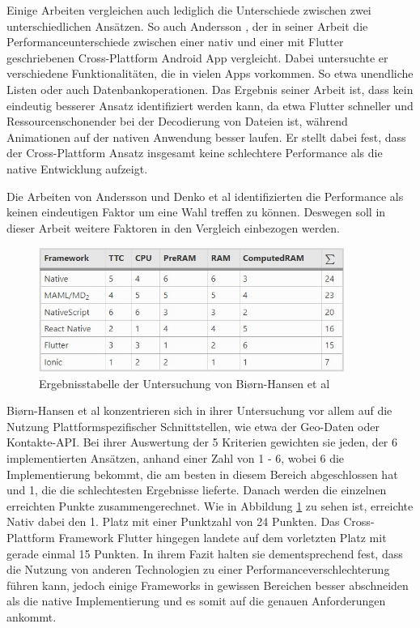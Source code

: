 Einige Arbeiten vergleichen auch lediglich die Unterschiede zwischen zwei unterschiedlichen Ansätzen. So auch Andersson \cite{Andersson_2022}, der in seiner Arbeit die Performanceunterschiede zwischen einer nativ und einer mit Flutter geschriebenen Cross-Plattform Android App vergleicht. Dabei untersuchte er verschiedene Funktionalitäten, die in vielen Apps vorkommen. So etwa unendliche Listen oder auch Datenbankoperationen. Das Ergebnis seiner Arbeit ist, dass kein eindeutig besserer Ansatz identifiziert werden kann, da etwa Flutter schneller und Ressourcenschonender bei der Decodierung von Dateien ist, während Animationen auf der nativen Anwendung besser laufen. Er stellt dabei fest, dass der Cross-Plattform Ansatz insgesamt keine schlechtere Performance als die native Entwicklung aufzeigt.

Die Arbeiten von Andersson und Denko et al identifizierten die Performance als keinen eindeutigen Faktor um eine Wahl treffen zu können. Deswegen soll in dieser Arbeit weitere Faktoren in den Vergleich einbezogen werden.

\begin{figure}[ht]
  \centering
  \includegraphics[width=10cm,keepaspectratio]{images/Biorn-Hansen_Result_table.jpg}
  \caption[Ergebnisstabelle der Untersuchung von Biørn-Hansen et al]{Ergebnisstabelle der Untersuchung von Biørn-Hansen et al \cite{BirnHansen.2020}}
  \label{fig:result_table_Biorn}
\end{figure}

Biørn-Hansen et al \cite{BirnHansen.2020} konzentrieren sich in ihrer Untersuchung vor allem auf die Nutzung Plattformspezifischer Schnittstellen, wie etwa der Geo-Daten oder Kontakte-API. Bei ihrer Auswertung der 5 Kriterien gewichten sie jeden, der 6 implementierten Ansätzen, anhand einer Zahl von 1 - 6, wobei 6 die Implementierung bekommt, die am besten in diesem Bereich abgeschlossen hat und 1, die die schlechtesten Ergebnisse lieferte. Danach werden die einzelnen erreichten Punkte zusammengerechnet. Wie in Abbildung \ref{fig:result_table_Biorn} zu sehen ist, erreichte Nativ dabei den 1. Platz mit einer Punktzahl von 24 Punkten. Das Cross-Plattform Framework Flutter hingegen landete auf dem vorletzten Platz mit gerade einmal 15 Punkten. In ihrem Fazit halten sie dementsprechend fest, dass die Nutzung von anderen Technologien zu einer Performanceverschlechterung führen kann, jedoch einige Frameworks in gewissen Bereichen besser abschneiden als die native Implementierung und es somit auf die genauen Anforderungen ankommt.

